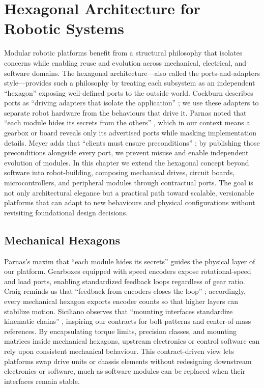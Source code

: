 \chapter{Hexagonal Architecture for Robotic Systems}
\label{chap:hexagonal-robotics}

Modular robotic platforms benefit from a structural philosophy that isolates concerns while enabling reuse and evolution across
mechanical, electrical, and software domains. The hexagonal architecture—also called the ports-and-adapters style—provides
such a philosophy by treating each subsystem as an independent ``hexagon'' exposing well-defined ports to the outside world.
Cockburn describes ports as ``driving adapters that isolate the application'' \cite{cockburn2005hexagonal}; we use these
adapters to separate robot hardware from the behaviours that drive it. Parnas noted that ``each module hides its secrets from
the others'' \cite{parnas1972}, which in our context means a gearbox or board reveals only its advertised ports while masking
implementation details. Meyer adds that ``clients must ensure preconditions'' \cite{meyer1992}; by publishing those
preconditions alongside every port, we prevent misuse and enable independent evolution of modules. In this chapter we extend
the hexagonal concept beyond software into robot-building, composing mechanical drives, circuit boards, microcontrollers, and
peripheral modules through contractual ports. The goal is not only architectural elegance but a practical path toward
scalable, versionable platforms that can adapt to new behaviours and physical configurations without revisiting foundational
design decisions.

\section{Mechanical Hexagons}
Parnas's maxim that ``each module hides its secrets'' \cite{parnas1972} guides the physical layer of our platform. Gearboxes
equipped with speed encoders expose rotational-speed and load ports, enabling standardized feedback loops regardless of gear
ratio. Craig reminds us that ``feedback from encoders closes the loop'' \cite{Craig2005}; accordingly, every mechanical hexagon
exports encoder counts so that higher layers can stabilize motion. Siciliano observes that ``mounting interfaces standardize
kinematic chains'' \cite{Siciliano2009}, inspiring our contracts for bolt patterns and center-of-mass references. By
encapsulating torque limits, precision classes, and mounting matrices inside mechanical hexagons, upstream electronics or
control software can rely upon consistent mechanical behaviour. This contract-driven view lets platforms swap drive units or
chassis elements without redesigning downstream electronics or software, much as software modules can be replaced when their
interfaces remain stable.

